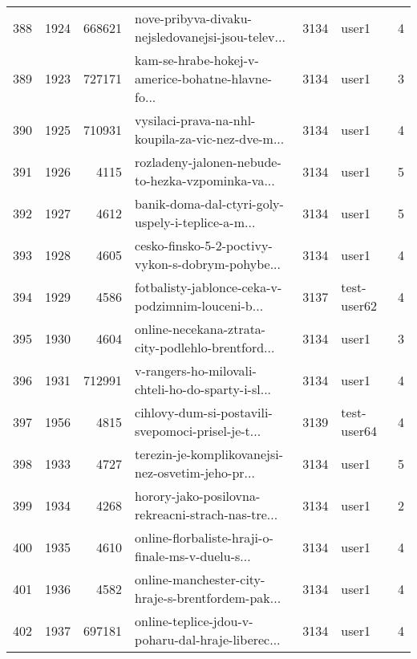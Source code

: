 \begin{tabular}{lrrlrlr}
388  &       1924 &   668621 &  nove-pribyva-divaku-nejsledovanejsi-jsou-telev... &     3134 &                        user1 &               4 \\
389  &       1923 &   727171 &  kam-se-hrabe-hokej-v-americe-bohatne-hlavne-fo... &     3134 &                        user1 &               3 \\
390  &       1925 &   710931 &  vysilaci-prava-na-nhl-koupila-za-vic-nez-dve-m... &     3134 &                        user1 &               4 \\
391  &       1926 &     4115 &  rozladeny-jalonen-nebude-to-hezka-vzpominka-va... &     3134 &                        user1 &               5 \\
392  &       1927 &     4612 &  banik-doma-dal-ctyri-goly-uspely-i-teplice-a-m... &     3134 &                        user1 &               5 \\
393  &       1928 &     4605 &  cesko-finsko-5-2-poctivy-vykon-s-dobrym-pohybe... &     3134 &                        user1 &               4 \\
394  &       1929 &     4586 &  fotbalisty-jablonce-ceka-v-podzimnim-louceni-b... &     3137 &                  test-user62 &               4 \\
395  &       1930 &     4604 &  online-necekana-ztrata-city-podlehlo-brentford... &     3134 &                        user1 &               3 \\
396  &       1931 &   712991 &  v-rangers-ho-milovali-chteli-ho-do-sparty-i-sl... &     3134 &                        user1 &               4 \\
397  &       1956 &     4815 &  cihlovy-dum-si-postavili-svepomoci-prisel-je-t... &     3139 &                  test-user64 &               4 \\
398  &       1933 &     4727 &  terezin-je-komplikovanejsi-nez-osvetim-jeho-pr... &     3134 &                        user1 &               5 \\
399  &       1934 &     4268 &  horory-jako-posilovna-rekreacni-strach-nas-tre... &     3134 &                        user1 &               2 \\
400  &       1935 &     4610 &  online-florbaliste-hraji-o-finale-ms-v-duelu-s... &     3134 &                        user1 &               4 \\
401  &       1936 &     4582 &  online-manchester-city-hraje-s-brentfordem-pak... &     3134 &                        user1 &               4 \\
402  &       1937 &   697181 &  online-teplice-jdou-v-poharu-dal-hraje-liberec... &     3134 &                        user1 &               4 \\

\end{tabular}
